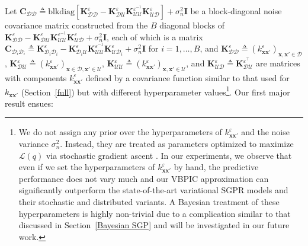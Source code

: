 \documentclass[conference]{IEEEtran}
\begin{document}
Let $\mathbf{C}_{\mathcal{DD}}\triangleq\mathrm{blkdiag}[\mathbf{K}^{\varepsilon}_{\mathcal{D}\mathcal{D}}-\mathbf{K}^{\varepsilon}_{\mathcal{D}\mathcal{U}}\mathbf{K}^{\varepsilon^{-1}}_{\mathcal{U}\mathcal{U}}\mathbf{K}^{\varepsilon}_{\mathcal{U}\mathcal{D}}]+\sigma^2_n\mathbf{I}$ be a block-diagonal noise covariance matrix constructed from the $B$ diagonal blocks of $\mathbf{K}^{\varepsilon}_{\mathcal{D}\mathcal{D}}-\mathbf{K}^{\varepsilon}_{\mathcal{D}\mathcal{U}}\mathbf{K}^{\varepsilon^{-1}}_{\mathcal{U}\mathcal{U}}\mathbf{K}^{\varepsilon}_{\mathcal{U}\mathcal{D}}+\sigma^2_n\mathbf{I}$, each of which is a matrix $\mathbf{C}_{\mathcal{D}_i\mathcal{D}_i}\triangleq\mathbf{K}^{\varepsilon}_{\mathcal{D}_i\mathcal{D}_i}-\mathbf{K}^{\varepsilon}_{\mathcal{D}_i\mathcal{U}}\mathbf{K}^{\varepsilon^{-1}}_{\mathcal{U}\mathcal{U}}\mathbf{K}^{\varepsilon}_{\mathcal{U}\mathcal{D}_i}+\sigma^2_n\mathbf{I}$ for $i=1,\ldots,B$, and $\mathbf{K}^{\varepsilon}_{\mathcal{D}\mathcal{D}} \triangleq (k^{\varepsilon}_{\mathbf{x}\mathbf{x}'})_{\mathbf{x},\mathbf{x}' \in \mathcal{D}}$, $\mathbf{K}^{\varepsilon}_{\mathcal{D}\mathcal{U}} \triangleq (k^{\varepsilon}_{\mathbf{x}\mathbf{x}'})_{\mathbf{x} \in \mathcal{D},\mathbf{x}' \in \mathcal{U}}$, $\mathbf{K}^{\varepsilon}_{\mathcal{U}\mathcal{U}}\triangleq (k^{\varepsilon}_{\mathbf{x}\mathbf{x}'})_{\mathbf{x},\mathbf{x}' \in \mathcal{U}}$, and $\mathbf{K}^{\varepsilon}_{\mathcal{U}\mathcal{D}} \triangleq \mathbf{K}^{\varepsilon^\top}_{\mathcal{D}\mathcal{U}}$ are matrices with components $k^{\varepsilon}_{\mathbf{x}\mathbf{x}'}$ defined by a covariance function similar to that used for $k_{\mathbf{x}\mathbf{x}'}$ (Section~\ref{full}) but with different hyperparameter values\footnote{We do not assign any prior over the hyperparameters of $k^{\varepsilon}_{\mathbf{x}\mathbf{x}'}$ and the noise variance $\sigma^2_n$. 
Instead, they are treated as parameters optimized to maximize $\mathcal{L}(q)$ via stochastic gradient ascent \cite{Lawrence13}. 
In our experiments, we observe that even if we set the hyperparameters of $k^{\varepsilon}_{\mathbf{x}\mathbf{x}'}$ by hand, the predictive performance does not vary much and our VBPIC approximation can significantly outperform the state-of-the-art variational SGPR models and their stochastic and distributed variants. A Bayesian treatment of these hyperparameters is highly non-trivial due to a complication similar to that discussed in Section~\ref{Bayesian SGP} 
and will be investigated in our future work.}. Our first major result ensues:\vspace{1mm}
\end{document}
